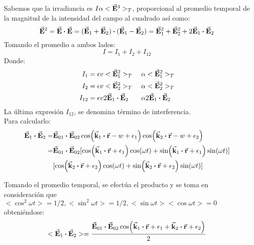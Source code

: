 \documentclass{article}
\begin{document}
  Sabemos que la irradiancia es $I \alpha <\va{E}^3>_T$, proporcional al promedio temporal
  de la magnitud de la intensidad del campo al cuadrado así como:
  \begin{equation}
    \label{eq:3}
    \va{E}^2 = \va{E}\dotproduct\va{E} = ( \va{E}_1 + \va{E}_2 )\dotproduct( \va{E}_1 -  \va{E}_2 ) = \va{E}_1^2 + \va{E}_2^2 + 2\va{E}_1\dotproduct\va{E}_2 
  \end{equation}
  Tomando el promedio a ambos lados:
  $$ I = I_1 + I_2 + I_{12}$$
  Donde:
  \begin{equation}
    \label{eq:4}
    \begin{aligned}
      I_1& = \epsilon v <\va{E}_1^2>_T &\ \alpha & <\va{E}_1^2>_T \\
      I_2& = \epsilon v <\va{E}_2^2>_T &\ \alpha & <\va{E}_2^2>_T \\
      I_{12}& = \epsilon v 2\va{E}_1\dotproduct\va{E}_2 &\ \alpha &2\va{E}_1\dotproduct\va{E}_2\\
    \end{aligned}
  \end{equation}
  La última expresión $I_{12}$, se denomina término de interferencia.
  \\
  Para calcularlo:
  \begin{equation}
    \label{eq:5}
    \begin{aligned}
      \va{E}_1\dotproduct\va{E}_2 =& \va{E}_{01}\dotproduct\va{E}_{02}\cos(\va{k}_1\dotproduct\va{r} - w + \epsilon_1)\cos(\va{k}_2\dotproduct\va{r} - w + \epsilon_2) \\
      =& \va{E}_{01}\dotproduct\va{E}_{02}[\cos(\va{k}_1\dotproduct\va{r} + \epsilon_1)\cos(\omega t) + \sin(\va{k}_1\dotproduct\va{r} + \epsilon_1)\sin(\omega t)]
      \\ & [\cos(\va{k}_2\dotproduct\va{r} + \epsilon_2)\cos(\omega t) + \sin(\va{k}_2\dotproduct\va{r} + \epsilon_2)\sin(\omega t)]
    \end{aligned}
  \end{equation}

  Tomando el promedio temporal, se efectúa el producto y se toma en consideración que
  $<\cos^2\omega t> = 1/2, <\sin^2\omega t> = 1/2, <\sin\omega t><\cos\omega t> = 0$
  obteniéndose:
  \begin{equation}
    \label{eq:6}
    <\va{E}_1\dotproduct\va{E}_2> = \frac{\va{E}_{01}\dotproduct\va{E}_{02}\cos(\va{k}_1\dotproduct\va{r} + \epsilon_1 + \va{k}_2\dotproduct\va{r} + \epsilon_2) }{2}
  \end{equation}
  
\end{document}
